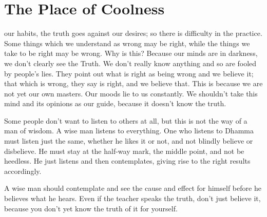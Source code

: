 
\renewcommand{\chapterFootnotemark}{\footnotemark}
\renewcommand{\chapterFootnotetext}{\footnotetext{\textit{Note}: This talk has been published elsewhere under the title: `\textit{Right View -- the Place of Coolness}'}}

\chapter{The Place of Coolness}

 our habits, the truth goes against our desires; so there is difficulty in the practice. Some things which we understand as wrong may be right, while the things we take to be right may be wrong. Why is this? Because our minds are in darkness, we don't clearly see the Truth. We don't really know anything and so are fooled by people's lies. They point out what is right as being wrong and we believe it; that which is wrong, they say is right, and we believe that. This is because we are not yet our own masters. Our moods lie to us constantly. We shouldn't take this mind and its opinions as our guide, because it doesn't know the truth. 

Some people don't want to listen to others at all, but this is not the way of a man of wisdom. A wise man listens to everything. One who listens to Dhamma must listen just the same, whether he likes it or not, and not blindly believe or disbelieve. He must stay at the half-way mark, the middle point, and not be heedless. He just listens and then contemplates, giving rise to the right results accordingly. 

A wise man should contemplate and see the cause and effect for himself before he believes what he hears. Even if the teacher speaks the truth, don't just believe it, because you don't yet know the truth of it for yourself. 

